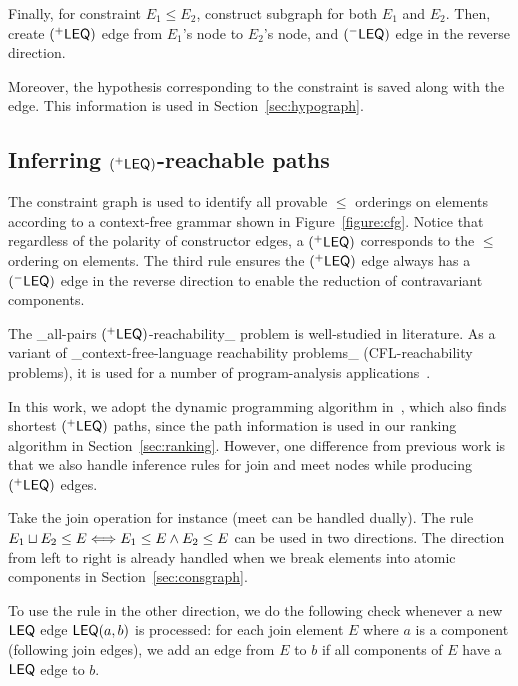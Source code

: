 Finally, for constraint $E_1\leq E_2$, construct subgraph for both
$E_1$ and $E_2$. Then, create $(^{+}\mathsf{LEQ})$ edge from $E_1$'s
node to $E_2$'s node, and $(^{-}\mathsf{LEQ})$ edge in the reverse
direction. 

Moreover, the hypothesis corresponding to the constraint is saved
along with the edge. This information is used in
Section~\ref{sec:hypograph}.

\subsection{Inferring $(^{+}\mathsf{LEQ})$-reachable paths}
\label{sec:leqedge}

The constraint graph is used to identify all provable $\leq$ orderings on
elements according to a context-free grammar shown in
Figure~\ref{figure:cfg}. Notice that regardless of the polarity of
constructor edges, a $(^{+}\mathsf{LEQ})$ 
corresponds to the $\leq$ ordering on elements. The third rule ensures
the $(^{+}\mathsf{LEQ})$ edge always has a $(^{-}\mathsf{LEQ})$ edge
in the reverse direction to enable the reduction of contravariant
components.

The _all-pairs $(^{+}\mathsf{LEQ})$-reachability_ problem is
well-studied in literature\cite{melski-cflgraph,barrett-cflpath}. As a
variant of _context-free-language reachability problems_
(CFL-reachability problems), it is used for a number of
program-analysis applications~\cite{reps-graph}. 

In this work, we adopt the dynamic programming algorithm
in~\cite{barrett-cflpath}, which also
finds shortest $(^{+}\mathsf{LEQ})$ paths,
since the path information is used in our ranking algorithm in
Section~\ref{sec:ranking}.
%
However, one difference from previous work is that we also handle
inference rules for join and meet nodes while producing
$(^{+}\mathsf{LEQ})$ edges.

Take the join operation for instance (meet can be handled dually).
The rule $E_1\sqcup E_2\leq E \Longleftrightarrow E_1\leq E \land E_2 \leq
E $ can be used in two directions. The direction from left to right is
already handled when we break elements into atomic components in
Section~\ref{sec:consgraph}.

To use the rule in the other direction, we do the following check
whenever a new $\mathsf{LEQ}$ edge $\mathsf{LEQ}(a,b)$ is processed: for each join
element $E$ where $a$ is a component (following join edges), we add
an edge from $E$ to $b$ if all components of $E$ have a $\mathsf{LEQ}$ edge
to $b$. 

